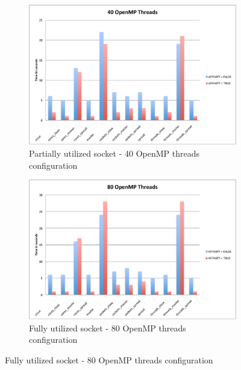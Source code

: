 \begin{figure}[!h]
    \centering
    \begin{subfigure}[b]{0.5\textwidth}
        \includegraphics[width=\textwidth]{./Images/J40_time_bar}
        \caption{Partially utilized socket - 40 OpenMP threads configuration}
        \label{fig:J40}
    \end{subfigure}
  
    \begin{subfigure}[b]{0.5\textwidth}
        \includegraphics[width=\textwidth]{./Images/J80_time_bar}
        \caption{Fully utilized socket - 80 OpenMP threads configuration}
        \label{fig:J80}
    \end{subfigure}
  

\end{figure}
